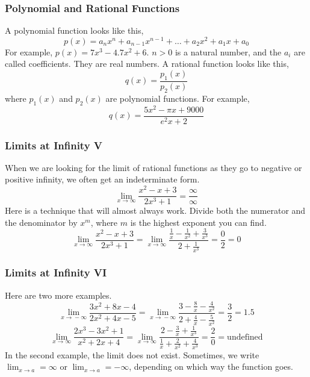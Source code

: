 \documentclass[xcolor=dvipsnames]{beamer}
\begin{document}
\begin{frame}
  \frametitle{Polynomial and Rational Functions}
A polynomial function looks like this,
\begin{equation}
  \label{eq:kaimeeyo}
  p(x)=a_{n}x^{n}+a_{n-1}x^{n-1}+\ldots{}+a_{2}x^{2}+a_{1}x+a_{0}
\end{equation}
For example, $p(x)=7x^{3}-4.7x^{2}+6$. $n>0$ is a natural number, and
the $a_{i}$ are called \alert{coefficients}. They are real numbers.
A rational function looks like this,
\begin{equation}
  \label{eq:raephoot}
  q(x)=\frac{p_{1}(x)}{p_{2}(x)}
\end{equation}
where $p_{1}(x)$ and $p_{2}(x)$ are polynomial functions. For example,
\begin{equation}
  \label{eq:yaingiaj}
  q(x)=\frac{5x^{2}-\pi{}x+9000}{e^{2}x+2}
\end{equation}
\end{frame}

\begin{frame}
  \frametitle{Limits at Infinity V}
When we are looking for the limit of rational functions as they go to
negative or positive infinity, we often get an indeterminate form.
\begin{equation}
  \label{eq:airoovae}
  \lim_{x\rightarrow\infty}\frac{x^{2}-x+3}{2x^{3}+1}=\frac{\infty}{\infty}
\end{equation}
Here is a technique that will almost always work. Divide both the
numerator and the denominator by $x^{m}$, where $m$ is the highest
exponent you can find.
\begin{equation}
  \label{eq:ahrahnei}
  \lim_{x\rightarrow\infty}\frac{x^{2}-x+3}{2x^{3}+1}=\lim_{x\rightarrow\infty}\frac{\frac{1}{x}-\frac{1}{x^{2}}+\frac{3}{x^{3}}}{2+\frac{1}{x^{3}}}=\frac{0}{2}=0
\end{equation}
\end{frame}

\begin{frame}
  \frametitle{Limits at Infinity VI}
Here are two more examples.
\begin{equation}
  \label{eq:ikiegeip}
  \lim_{x\rightarrow{}-\infty}\frac{3x^{2}+8x-4}{2x^{2}+4x-5}=\lim_{x\rightarrow{}-\infty}\frac{3-\frac{8}{x}-\frac{4}{x^{2}}}{2+\frac{4}{x}-\frac{5}{x^{2}}}=\frac{3}{2}=1.5
\end{equation}
\begin{equation}
  \label{eq:deegiech}
  \lim_{x\rightarrow{}\infty}\frac{2x^{3}-3x^{2}+1}{x^{2}+2x+4}=\lim_{x\rightarrow{}\infty}\frac{2-\frac{3}{x}+\frac{1}{x^{3}}}{\frac{1}{x}+\frac{2}{x^{2}}+\frac{4}{x^{3}}}=\frac{2}{0}=\mbox{undefined}
\end{equation}
In the second example, the limit does not exist. Sometimes, we write
$\lim_{x\rightarrow{}a}=\infty$ or $\lim_{x\rightarrow{}a}=-\infty$,
depending on which way the function goes.
\end{frame}
\end{document}
